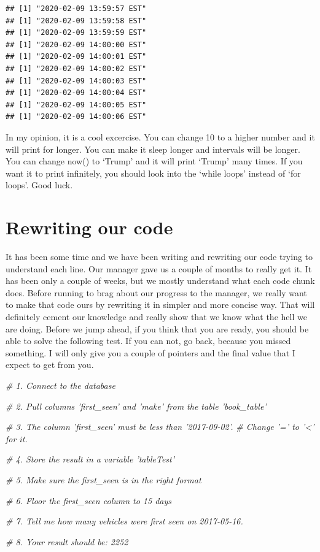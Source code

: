 \documentclass[]{book}
\newenvironment{Shaded}{\begin{snugshade}}{\end{snugshade}}
\newcommand{\CommentTok}[1]{\textcolor[rgb]{0.56,0.35,0.01}{\textit{#1}}}
\begin{document}
\begin{verbatim}
## [1] "2020-02-09 13:59:57 EST"
## [1] "2020-02-09 13:59:58 EST"
## [1] "2020-02-09 13:59:59 EST"
## [1] "2020-02-09 14:00:00 EST"
## [1] "2020-02-09 14:00:01 EST"
## [1] "2020-02-09 14:00:02 EST"
## [1] "2020-02-09 14:00:03 EST"
## [1] "2020-02-09 14:00:04 EST"
## [1] "2020-02-09 14:00:05 EST"
## [1] "2020-02-09 14:00:06 EST"
\end{verbatim}

In my opinion, it is a cool excercise. You can change 10 to a higher number and it will print for longer. You can make it sleep longer and intervals will be longer. You can change now() to `Trump' and it will print `Trump' many times. If you want it to print infinitely, you should look into the `while loops' instead of `for loops'. Good luck.

\hypertarget{rewriting-our-code}{%
\section{Rewriting our code}\label{rewriting-our-code}}

It has been some time and we have been writing and rewriting our code trying to understand each line. Our manager gave us a couple of months to really get it. It has been only a couple of weeks, but we mostly understand what each code chunk does. Before running to brag about our progress to the manager, we really want to make that code ours by rewriting it in simpler and more concise way. That will definitely cement our knowledge and really show that we know what the hell we are doing. Before we jump ahead, if you think that you are ready, you should be able to solve the following test. If you can not, go back, because you missed something. I will only give you a couple of pointers and the final value that I expect to get from you.

\begin{Shaded}
\begin{Highlighting}[]
\CommentTok{# 1. Connect to the database}

\CommentTok{# 2. Pull columns 'first_seen' and 'make' from the table 'book_table'}

\CommentTok{# 3. The column 'first_seen' must be less than '2017-09-02'. }
\CommentTok{# Change '=' to '<' for it.}

\CommentTok{# 4. Store the result in a variable 'tableTest'}

\CommentTok{# 5. Make sure the first_seen is in the right format}

\CommentTok{# 6. Floor the first_seen column to 15 days}

\CommentTok{# 7. Tell me how many vehicles were first seen on 2017-05-16.}

\CommentTok{# 8. Your result should be: 2252}
\end{Highlighting}
\end{Shaded}
\end{document}
